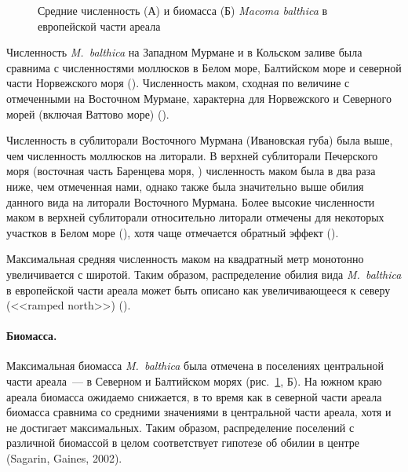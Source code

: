 {\begin{figure}[]
\begin{minipage}[b]{.5\linewidth}
\begin{center}
			\end{center}
		\end{minipage}
	\caption{Средние численность (А) и биомасса (Б) {\it Macoma balthica} в европейской части ареала}
	\label{ris:NB_areal}
	\end{figure}
Численность {\it M.~balthica} на Западном Мурмане и в Кольском заливе была сравнима с численностями моллюсков в Белом море, Балтийском море и северной части Норвежского моря (\cite{Semenova_1974, Aschan_1988, Maximovich_et_al_1991, Bonsdorff_et_al_1995, Bostrom_Bonsdorff_2000, Oug_2001, Laine_et_al_2003, Khaitov_et_al_2007, Varfolomeeva_Naumov_2013}).
Численность маком, сходная по величине с отмеченными на Восточном Мурмане, характерна для Норвежского и Северного морей (включая Ваттово море) (\cite{Brady_1943, Sneli_1968, Stromgren_et_al_1973, Beukema_1976, Jensen_Jensen_1985, Jensen_et_al_1985, Madsen_Jensen_1987, Beukema_1979, Zwarts_Wanink_1993, Reise_et_al_1994}).

Численность в сублиторали Восточного Мурмана (Ивановская губа) была выше, чем численность моллюсков на литорали.
В верхней сублиторали Печерского моря (восточная часть Баренцева моря, \cite{Denisenko_et_al_2003}) численность маком была в два раза ниже, чем отмеченная нами, однако также была значительно выше обилия данного вида на литорали Восточного Мурмана.
Более высокие численности маком в верхней сублиторали относительно литорали отмечены для некоторых участков в Белом море (\cite{Semenova_1974}), хотя чаще отмечается обратный эффект (\cite{Semenova_1974, Maximovich_et_al_1991}).

Максимальная средняя численность маком на квадратный метр монотонно увеличивается с широтой.
Таким образом, распределение обилия вида {\it M.~balthica} в европейской части ареала может быть описано как увеличивающееся к северу (<<ramped north>>) (\cite{Sagarin_Gaines_2002}).

\paragraph{Биомасса.}
Максимальная биомасса \textit{M.~balthica} была отмечена в поселениях центральной части ареала~--- в Северном и Балтийском морях (рис.~\ref{ris:NB_areal}, Б).
На южном краю ареала биомасса ожидаемо снижается, в то время как в северной части ареала биомасса сравнима со средними значениями в центральной части ареала, хотя и не достигает максимальных.
Таким образом, распределение поселений с различной биомассой в целом соответствует гипотезе об обилии в центре (Sagarin, Gaines, 2002).

}
